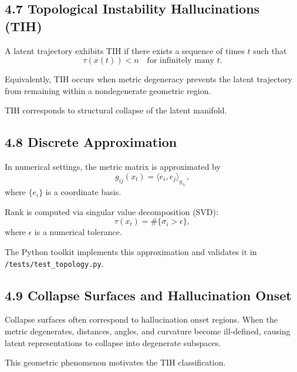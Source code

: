 \subsection*{4.7 Topological Instability Hallucinations (TIH)}

A latent trajectory exhibits TIH if there exists a sequence of times $t$
such that
\[
\tau(x(t)) < n
\quad \text{for infinitely many } t.
\]

Equivalently, TIH occurs when metric degeneracy prevents the latent
trajectory from remaining within a nondegenerate geometric region.

TIH corresponds to structural collapse of the latent manifold.

\subsection*{4.8 Discrete Approximation}

In numerical settings, the metric matrix is approximated by
\[
g_{ij}(x_t)
= \langle e_i, e_j \rangle_{g_{x_t}},
\]
where $\{e_i\}$ is a coordinate basis.

Rank is computed via singular value decomposition (SVD):
\[
\tau(x_t) = \#\{ \sigma_i > \epsilon \},
\]
where $\epsilon$ is a numerical tolerance.

The Python toolkit implements this approximation and validates it in
\texttt{/tests/test\_topology.py}.

\subsection*{4.9 Collapse Surfaces and Hallucination Onset}

Collapse surfaces often correspond to hallucination onset regions.  
When the metric degenerates, distances, angles, and curvature become
ill-defined, causing latent representations to collapse into degenerate
subspaces.

This geometric phenomenon motivates the TIH classification.

